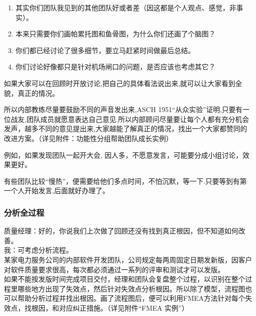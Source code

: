 \begin{enumerate}
\tightlist
\item
  其实你们团队我见到的其他团队好或者差（因这都是个人观点、感觉，非事实）。
\item
  本来只需要你们画帕累托图和鱼骨图，为什么你们还画了个脑图？
\item
  你们都已经讨论了很多细节，要立马赶紧时间做最后总结。
\item
  你们讨论好像都只是针对机场闸口的问题，是否应该也考虑其它？
\end{enumerate}



如果大家可以在回顾时开放讨论,把自己的具体看法说出来,就可以让大家看到全貌，真正的情况。

所以内部教练尽量要鼓励不同的声音发出来,ASCH
1951``从众实验''证明,只要有一位战友,团队成员就愿意表达自己意见.所以内部顾问尽量要让每个人都有充分机会发声，越多不同的意见提出来,大家越能了解真正的情况，找出一个大家都赞同的改进方案。（详见附件：功能性分组帮助团队成长实例）

例如，如果发现团队一起开大会,
因人多，不愿意发言，可能要分成小组讨论，效果更好。

有些团队比较``慢热''，便需要给他们多点时间，不怕沉默，等一下.只要等到有第一个人开始发言,后面就好办理了。

\hypertarget{ux5206ux6790ux5168ux8fc7ux7a0b}{%
\subsubsection{分析全过程}\label{ux5206ux6790ux5168ux8fc7ux7a0b}}

质量经理：好的，你说我们上次做了回顾还没有找到真正根因，但不知道如何改善。\\
我：可考虑分析流程。\\
某家电力服务公司的内部软件开发团队，公司规定每两周固定日期发新版，因客户对软件质量要求很高，每次都必须通过一系列的评审和测试才可以发版。\\
如果不能按发版时间完成项目交付，经理和团队会复盘整个过程，以识别在整个过程里哪些地方出现了失效点，然后针对失效点分析根因。所以除了模型，流程图也可以帮助分析过程并找出根因。画了流程图后，便可以利用FMEA方法针对每个失效点，找根因，和对应纠正措施。（详见附件``FMEA
实例''）

